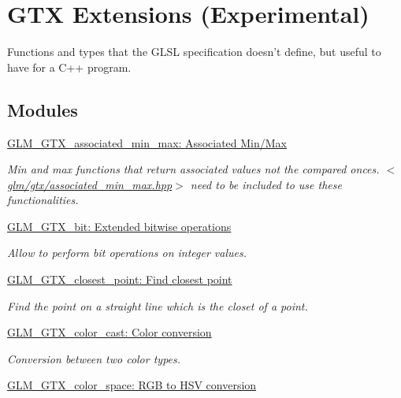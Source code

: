 \hypertarget{group__gtx}{\section{\-G\-T\-X \-Extensions (\-Experimental)}
\label{group__gtx}
}


\-Functions and types that the \-G\-L\-S\-L specification doesn't define, but useful to have for a \-C++ program.  


\subsection*{\-Modules}
\begin{DoxyCompactItemize}
\item 
\hyperlink{group__gtx__associated__min__max}{\-G\-L\-M\-\_\-\-G\-T\-X\-\_\-associated\-\_\-min\-\_\-max\-: Associated Min/\-Max}
\begin{DoxyCompactList}\small\item\em \-Min and max functions that return associated values not the compared onces. $<$\hyperlink{associated__min__max_8hpp}{glm/gtx/associated\-\_\-min\-\_\-max.\-hpp}$>$ need to be included to use these functionalities. \end{DoxyCompactList}\item 
\hyperlink{group__gtx__bit}{\-G\-L\-M\-\_\-\-G\-T\-X\-\_\-bit\-: Extended bitwise operations}
\begin{DoxyCompactList}\small\item\em \-Allow to perform bit operations on integer values. \end{DoxyCompactList}\item 
\hyperlink{group__gtx__closest__point}{\-G\-L\-M\-\_\-\-G\-T\-X\-\_\-closest\-\_\-point\-: Find closest point}
\begin{DoxyCompactList}\small\item\em \-Find the point on a straight line which is the closet of a point. \end{DoxyCompactList}\item 
\hyperlink{group__gtx__color__cast}{\-G\-L\-M\-\_\-\-G\-T\-X\-\_\-color\-\_\-cast\-: Color conversion}
\begin{DoxyCompactList}\small\item\em \-Conversion between two color types. \end{DoxyCompactList}\item 
\hyperlink{group__gtx__color__space}{\-G\-L\-M\-\_\-\-G\-T\-X\-\_\-color\-\_\-space\-: R\-G\-B to H\-S\-V conversion}

\end{DoxyCompactItemize}
